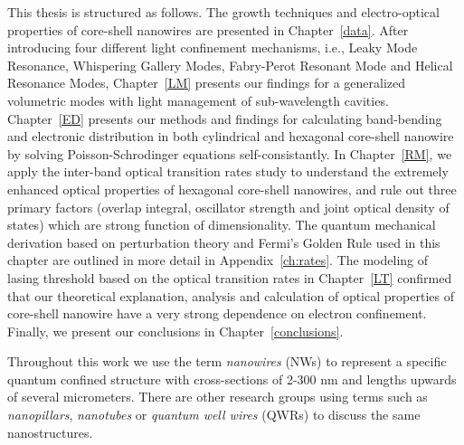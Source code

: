 This thesis is structured as follows. The growth techniques and electro-optical
properties of core-shell nanowires are presented in Chapter~\ref{data}.  After
introducing four different light confinement mechanisms, i.e., Leaky Mode
Resonance, Whispering Gallery Modes, Fabry-Perot Resonant Mode and Helical
Resonance Modes, Chapter~\ref{LM} presents our findings for a generalized
volumetric modes with light management of sub-wavelength cavities.
Chapter~\ref{ED} presents our methods and findings for calculating band-bending
and electronic distribution in both cylindrical and hexagonal core-shell
nanowire by solving Poisson-Schrodinger equations self-consistantly.  In
Chapter~\ref{RM}, we apply the inter-band optical transition rates study to
understand the extremely enhanced optical properties of hexagonal core-shell
nanowires, and rule out three primary factors (overlap integral, oscillator
strength and joint optical density of states) which are strong function of
dimensionality. The quantum mechanical derivation based on perturbation theory
and Fermi's Golden Rule used in this chapter are outlined in more detail in
Appendix~\ref{ch:rates}. The modeling of lasing threshold based on the optical
transition rates in Chapter~\ref{LT} confirmed that our theoretical
explanation, analysis and calculation of optical properties of core-shell
nanowire have a very strong dependence on electron confinement. Finally, we
present our conclusions in Chapter~\ref{conclusions}.

Throughout this work we use the term  {\em nanowires} (NWs) to represent a
specific quantum confined structure with cross-sections of 2-300 nm and lengths
upwards of several micrometers. There are other research groups using terms
such as {\em nanopillars}, {\em nanotubes} or {\em quantum well wires} (QWRs)
to discuss the same nanostructures.
